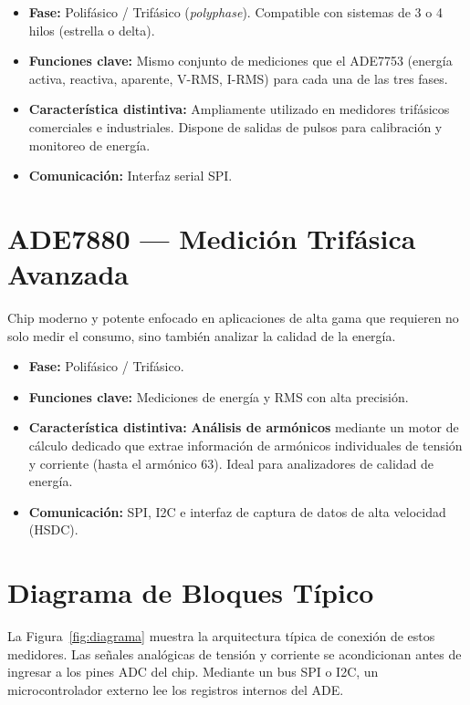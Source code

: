 \documentclass[12pt,a4paper]{article}
\begin{document}
\begin{itemize}[itemsep=1ex]
    \item \textbf{Fase:} Polifásico / Trifásico (\textit{polyphase}). Compatible con
          sistemas de 3 o 4 hilos (estrella o delta).
    \item \textbf{Funciones clave:} Mismo conjunto de mediciones que el ADE7753 (energía
          activa, reactiva, aparente, V-RMS, I-RMS) para cada una de las tres fases.
    \item \textbf{Característica distintiva:} Ampliamente utilizado en medidores
          trifásicos comerciales e industriales. Dispone de salidas de pulsos para
          calibración y monitoreo de energía.
    \item \textbf{Comunicación:} Interfaz serial SPI.
\end{itemize}

\section{ADE7880 --- Medición Trifásica Avanzada}

Chip moderno y potente enfocado en aplicaciones de alta gama que requieren no solo medir
el consumo, sino también analizar la calidad de la energía.

\begin{itemize}[itemsep=1ex]
    \item \textbf{Fase:} Polifásico / Trifásico.
    \item \textbf{Funciones clave:} Mediciones de energía y RMS con alta precisión.
    \item \textbf{Característica distintiva:} \textbf{Análisis de armónicos} mediante un
          motor de cálculo dedicado que extrae información de armónicos individuales de
          tensión y corriente (hasta el armónico 63). Ideal para analizadores de calidad
          de energía.
    \item \textbf{Comunicación:} SPI, I2C e interfaz de captura de datos de alta
          velocidad (HSDC).
\end{itemize}

\newpage
\section{Diagrama de Bloques Típico}

La Figura~\ref{fig:diagrama} muestra la arquitectura típica de conexión de estos
medidores. Las señales analógicas de tensión y corriente se acondicionan antes de
ingresar a los pines ADC del chip. Mediante un bus SPI o I2C, un microcontrolador
externo lee los registros internos del ADE.
\end{document}
